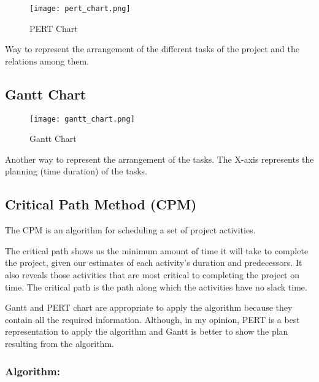 \begin{figure}[!ht]
    \centering
    \texttt{[image: pert\_chart.png]}
    \caption{PERT Chart}
\end{figure}

Way to represent the arrangement of the different tasks of the project and the relations
among them.

\subsection{Gantt Chart}

\begin{figure}[!ht]
    \centering
    \texttt{[image: gantt\_chart.png]}
    \caption{Gantt Chart}
\end{figure}

Another way to represent the arrangement of the tasks. The X-axis represents the planning
(time duration) of the tasks.

\subsection{Critical Path Method (CPM)}

The CPM is an algorithm for scheduling a set of project activities.
\newline

The critical path shows us the minimum amount of time it will take to complete the project,
given our estimates of each activity’s duration and predecessors. It also reveals those
activities that are most critical to completing the project on time.
\newline
The critical path is the path along which the activities have no slack time. \newline

Gantt and PERT chart are appropriate to apply the algorithm because they contain all the
required information. Although, in my opinion, PERT is a best representation to apply the
algorithm and Gantt is better to show the plan resulting from the algorithm.

\subsubsection{Algorithm:}

